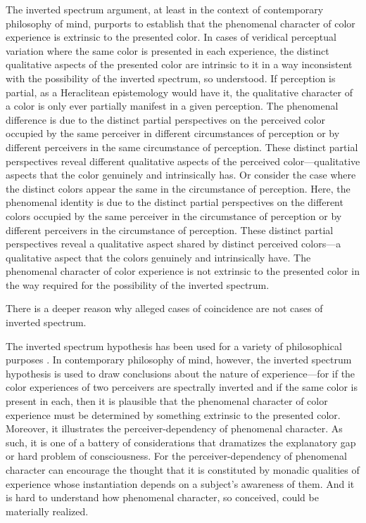 \documentclass[12pt]{article}
\begin{document}
The inverted spectrum argument, at least in the context of contemporary philosophy of mind, purports to establish that the phenomenal character of color experience is extrinsic to the presented color. In cases of veridical perceptual variation where the same color is presented in each experience, the distinct qualitative aspects of the presented color are intrinsic to it in a way inconsistent with the possibility of the inverted spectrum, so understood. If perception is partial, as a Heraclitean epistemology would have it, the qualitative character of a color is only ever partially manifest in a given perception. The phenomenal difference is due to the distinct partial perspectives on the perceived color occupied by the same perceiver in different circumstances of perception or by different perceivers in the same circumstance of perception. These distinct partial perspectives reveal different qualitative aspects of the perceived color---qualitative aspects that the color genuinely and intrinsically has. Or consider the case where the distinct colors appear the same in the circumstance of perception. Here, the phenomenal identity is due to the distinct partial perspectives on the different colors occupied by the same perceiver in the circumstance of perception or by different perceivers in the circumstance of perception. These distinct partial perspectives reveal a qualitative aspect shared by distinct perceived colors---a qualitative aspect that the colors genuinely and intrinsically have. The phenomenal character of color experience is not extrinsic to the presented color in the way required for the possibility of the inverted spectrum.

There is a deeper reason why alleged cases of coincidence are not cases of inverted spectrum.

The inverted spectrum hypothesis has been used for a variety of philosophical purposes \citep[see][for some of these]{Byrne:2005ve}. In contemporary philosophy of mind, however, the inverted spectrum hypothesis is used to draw conclusions about the nature of experience---for if the color experiences of two perceivers are spectrally inverted and if the same color is present in each, then it is plausible that the phenomenal character of color experience must be determined by something extrinsic to the presented color. Moreover, it illustrates the perceiver-dependency of phenomenal character. As such, it is one of a battery of considerations that dramatizes the explanatory gap or hard problem of consciousness. For the perceiver-dependency of phenomenal character can encourage the thought that it is constituted by monadic qualities of experience whose instantiation depends on a subject's awareness of them. And it is hard to understand how phenomenal character, so conceived, could be materially realized.
\end{document}

